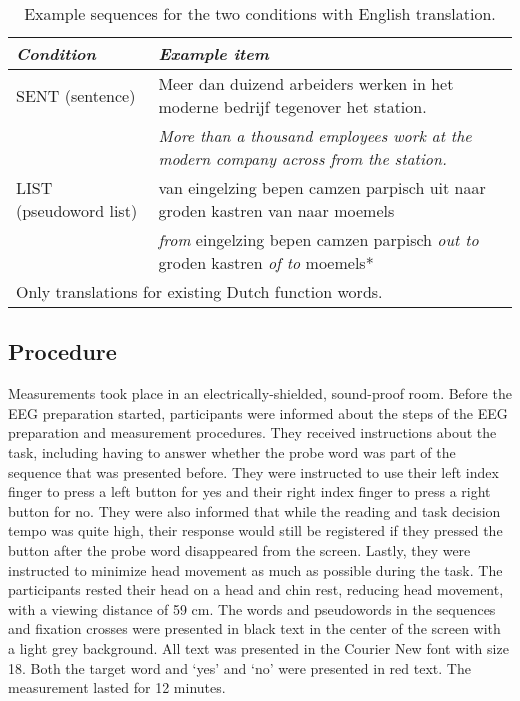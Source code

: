 \begin{table}[ht]
    \captionsetup{justification=raggedright, singlelinecheck=false, font = normal} %
    \renewcommand{\arraystretch}{1.5} %
    \caption{Example sequences for the two conditions with English translation.}
    \label{tab:example_sequences}
    \small
    \begin{tabular}{lp{12cm}}
    \hline
    \textit{Condition} & \textit{Example item} \\
    \hline
    SENT (sentence) & Meer dan duizend arbeiders werken in het moderne bedrijf tegenover het station. \\
     & \textit{More than a thousand employees work at the modern company across from the station.} \\
    LIST (pseudoword list) & van eingelzing bepen camzen parpisch uit naar groden kastren van naar moemels \\
     & \textit{from} eingelzing bepen camzen parpisch \textit{out to} groden kastren \textit{of to} moemels* \\
    \hline
    \multicolumn{2}{l}{\footnotesize *Only translations for existing Dutch function words.} \\
    \end{tabular}
    \normalsize
\end{table}



\subsection{Procedure}
Measurements took place in an electrically-shielded, sound-proof room. Before the EEG preparation started, participants were informed about the steps of the EEG preparation and measurement procedures. They received instructions about the task, including having to answer whether the probe word was part of the sequence that was presented before. They were instructed to use their left index finger to press a left button for yes and their right index finger to press a right button for no. They were also informed that while the reading and task decision tempo was quite high, their response would still be registered if they pressed the button after the probe word disappeared from the screen. Lastly, they were instructed to minimize head movement as much as possible during the task. The participants rested their head on a head and chin rest, reducing head movement, with a viewing distance of 59 cm. The words and pseudowords in the sequences and fixation crosses were presented in black text in the center of the screen with a light grey background. All text was presented in the Courier New font with size 18. Both the target word and `yes' and `no' were presented in red text. The measurement lasted for 12 minutes. 

